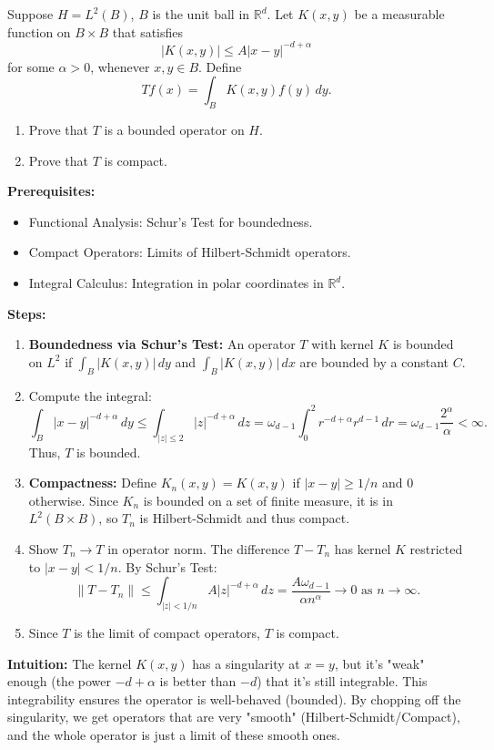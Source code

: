 \begin{exercise}
\label{analysis:2013:5}
Suppose $H=L^2(B)$, $B$ is the unit ball in $\mathbb{R}^d$. Let $K(x,y)$ be a measurable function on $B\times B$ that satisfies
\[
|K(x,y)| \leq A|x-y|^{-d+\alpha}
\]
for some $\alpha>0$, whenever $x,y\in B$. Define
\[
Tf(x) = \int_B K(x,y)f(y)\,dy.
\]
\begin{enumerate}
    \item Prove that $T$ is a bounded operator on $H$.
    \item Prove that $T$ is compact.
\end{enumerate}
\end{exercise}

\begin{solution}
\textbf{Prerequisites:}
\begin{itemize}
    \item Functional Analysis: Schur's Test for boundedness.
    \item Compact Operators: Limits of Hilbert-Schmidt operators.
    \item Integral Calculus: Integration in polar coordinates in $\mathbb{R}^d$.
\end{itemize}

\textbf{Steps:}
\begin{enumerate}
    \item \textbf{Boundedness via Schur's Test:} An operator $T$ with kernel $K$ is bounded on $L^2$ if $\int_B |K(x,y)| \, dy$ and $\int_B |K(x,y)| \, dx$ are bounded by a constant $C$.

    \item Compute the integral:
    \[
    \int_B |x-y|^{-d+\alpha} \, dy \leq \int_{|z| \leq 2} |z|^{-d+\alpha} \, dz = \omega_{d-1} \int_0^2 r^{-d+\alpha} r^{d-1} \, dr = \omega_{d-1} \frac{2^\alpha}{\alpha} < \infty.
    \]
    Thus, $T$ is bounded.

    \item \textbf{Compactness:} Define $K_n(x,y) = K(x,y)$ if $|x-y| \geq 1/n$ and $0$ otherwise. Since $K_n$ is bounded on a set of finite measure, it is in $L^2(B \times B)$, so $T_n$ is Hilbert-Schmidt and thus compact.

    \item Show $T_n \to T$ in operator norm. The difference $T - T_n$ has kernel $K$ restricted to $|x-y| < 1/n$. By Schur's Test:
    \[
    \|T - T_n\| \leq \int_{|z| < 1/n} A |z|^{-d+\alpha} \, dz = \frac{A \omega_{d-1}}{\alpha n^\alpha} \to 0 \text{ as } n \to \infty.
    \]

    \item Since $T$ is the limit of compact operators, $T$ is compact.
\end{enumerate}

\textbf{Intuition:}
The kernel $K(x,y)$ has a singularity at $x=y$, but it's "weak" enough (the power $-d+\alpha$ is better than $-d$) that it's still integrable. This integrability ensures the operator is well-behaved (bounded). By chopping off the singularity, we get operators that are very "smooth" (Hilbert-Schmidt/Compact), and the whole operator is just a limit of these smooth ones.
\end{solution}

